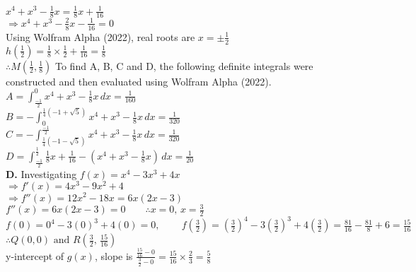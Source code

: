 \documentclass{homework}
\begin{document}
\begin{flushleft}
    $x^4+x^3-\frac{1}{8}x=\frac{1}{8}x+\frac{1}{16}$ \\
    $\Rightarrow x^4+x^3-\frac{2}{8}x-\frac{1}{16}=0$ \\
    Using Wolfram Alpha (2022), real roots are $x=\pm \frac{1}{2}$ \\
    $h(\frac{1}{2})=\frac{1}{8}\times \frac{1}{2}+\frac{1}{16}=\frac{1}{8}$ \\
    $\therefore M(\frac{1}{2}, \frac{1}{8})$ \linebreak \linebreak
    To find A, B, C and D, the following definite integrals were constructed and then evaluated using Wolfram Alpha (2022). \\
    $A=\int_{\frac{-1}{2}}^{0} x^4+x^3-\frac{1}{8}x\, dx=\frac{1}{160}$ \\
    $B=-\int_0^{\frac{1}{4}(-1+\sqrt{5})} x^4+x^3-\frac{1}{8}x \, dx=\frac{1}{320}$ \\
    $C=-\int_{\frac{1}{4}(-1-\sqrt{5})}^{\frac{-1}{2}} x^4+x^3-\frac{1}{8}x \, dx=\frac{1}{320}$ \\
    $D=\int_{\frac{-1}{2}}^{\frac{1}{2}} \frac{1}{8}x+\frac{1}{16}-(x^4+x^3-\frac{1}{8}x) \, dx=\frac{1}{20}$    \vspace{2.4em} \\
    \textbf{D. }Investigating $f(x)=x^{4}-3x^{3}+4x$ \vspace{0.8em}\\
    $\Rightarrow f'(x)=4x^3-9x^2+4$ \vspace{0.8em}\\
    $\Rightarrow f''(x)=12x^2-18x=6x(2x-3)$ \vspace{0.8em}\\
    $f''(x)=6x(2x-3)=0 \hspace{2em} \therefore x=0, \, x=\frac{3}{2}$ \vspace{0.8em}\\
    $ f(0)=0^4-3(0)^3+4(0)=0, \, \hspace{2em}f(\frac{3}{2})=(\frac{3}{2})^4-3(\frac{3}{2})^3+4(\frac{3}{2})=\frac{81}{16}-\frac{81}{8}+6=\frac{15}{16}$ \vspace{0.8em}\\
    $\therefore Q(0,0) \text{ and } R(\frac{3}{2},\, \frac{15}{16})$ \vspace{1em} \\
    y-intercept of $g(x)$, slope is $\frac{\frac{15}{16}-0}{\frac{3}{2}-0}=\frac{15}{16} \times \frac{2}{3}=\frac{5}{8}$ \vspace{0.8em} \\

\end{flushleft}
\end{document}

